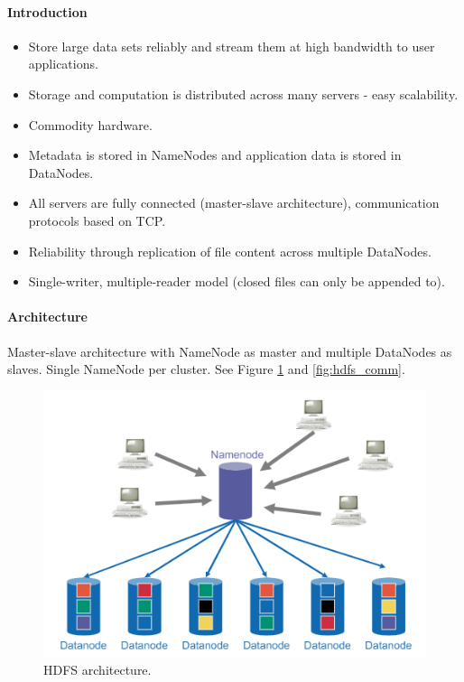 \paragraph{Introduction}
\begin{itemize}
    \item Store large data sets reliably and stream them at high bandwidth to user applications.
    \item Storage and computation is distributed across many servers - easy scalability.
    \item Commodity hardware.
    \item Metadata is stored in NameNodes and application data is stored in DataNodes.
    \item All servers are fully connected (master-slave architecture), communication protocols based on TCP.
    \item Reliability through replication of file content across multiple DataNodes.
    \item Single-writer, multiple-reader model (closed files can only be appended to).
\end{itemize}

\paragraph{Architecture}
Master-slave architecture with NameNode as master and multiple DataNodes as slaves. Single NameNode per cluster. See Figure \ref{fig:hdfs} and \ref{fig:hdfs_comm}.

\begin{figure}[h]
	\centering
	\includegraphics[scale=0.8]{images/2-hdfs.PNG}
	\caption{HDFS architecture.}
	\label{fig:hdfs}
\end{figure}

